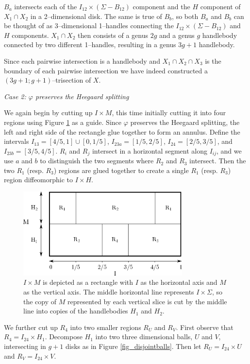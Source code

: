 \documentclass[12pt]{amsart}
\theoremstyle{definition}
\theoremstyle{remark}
\begin{document}
$B_a$ intersects each of the $I_{12} \times (\Sigma - B_{12})$ component and the $H$ component of $X_1 \cap X_2$ in a 2--dimensional disk.  The same is true of $B_b$, so both $B_a$ and $B_b$ can be thought of as 3--dimensional 1--handles connecting the $I_{12} \times (\Sigma - B_{12})$ and $H$ components.  $X_1 \cap X_2$ then consists of a genus $2g$ and a genus $g$ handlebody connected by two different 1--handles, resulting in a genus $3g+1$ handlebody. 

Since each pairwise intersection is a handlebody and $X_1 \cap X_2 \cap X_3$ is the boundary of each pairwise intersection we have indeed constructed a $(3g+1;g+1)$--trisection of $X$.


\smallskip
\noindent\textit{Case 2: $\varphi$ preserves the Heegaard splitting}\ \ 

We again begin by cutting up $I \times M$, this time initially cutting it into four regions using Figure \ref{preservebreakdown} as a guide.  Since $\varphi$ preserves the Heegaard splitting, the left and right side of the rectangle glue together to form an annulus.  Define the intervals $I_{13} = [4/5,1] \cup [0,1/5]$, $I_{23a} = [1/5,2/5]$, $I_{24} = [2/5,3/5]$, and $I_{23b} = [3/5,4/5]$.  $R_i$ and $R_j$ intersect in a horizontal segment along $I_{ij}$, and we use $a$ and $b$ to distinguish the two segments where $R_2$ and $R_3$ intersect.  Then the two $R_1$ (resp. $R_3$) regions are glued together to create a single $R_1$ (resp. $R_3$) region diffeomorphic to $I \times H$.  

\begin{figure}[h]
\centering
\includegraphics[height=1.8in]{MxS1_preserves.png}
\caption{$I \times M$ is depicted as a rectangle with $I$ as the horizontal axis and $M$ as the vertical axis.  The middle horizontal line represents $I \times \Sigma$, so the copy of $M$ represented by each vertical slice is cut by the middle line into copies of the handlebodies $H_1$ and $H_2$.}
\label{preservebreakdown}
\end{figure}

We further cut up $R_4$ into two smaller regions $R_U$ and $R_V$.  First observe that $R_4 = I_{24} \times H_1$.  Decompose $H_1$ into two three dimensional balls, $U$ and $V$, intersecting in $g+1$ disks as in Figure \ref{fig_disjointballs}.  Then let $R_U = I_{24}  \times U$ and $R_V = I_{24} \times V$.  
\end{document}
